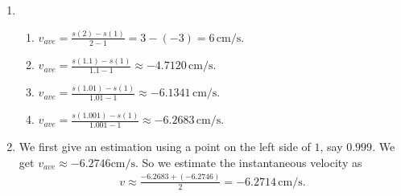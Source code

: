 	\spc
	
	\begin{enumerate}[label=(\alph*)]
	\item
	\begin{enumerate}[label=(\roman*)]
	\item $v_{ave} = \frac{s(2) - s(1)}{2 - 1} = 3 - (-3) = 6 \, \text{cm/s}$.
	\item $v_{ave} = \frac{s(1.1) - s(1)}{1.1 - 1} \approx -4.7120\,\text{cm/s}$.
	\item $v_{ave} = \frac{s(1.01) - s(1)}{1.01 - 1} \approx -6.1341 \,\text{cm/s}$.
	\item $v_{ave} = \frac{s(1.001) - s(1)}{1.001 -1} \approx -6.2683 \,\text{cm/s}$.
	\end{enumerate}
	\item We first give an estimation using a point on the left side of $1$, say $0.999$. We get $v_{ave} \approx -6.2746 \text{cm/s}$. So we estimate the instantaneous velocity as
		\begin{align*}
		v \approx \frac{-6.2683 + (-6.2746)}{2} = -6.2714\,\text{cm/s} .
		\end{align*}
	\end{enumerate}
	
